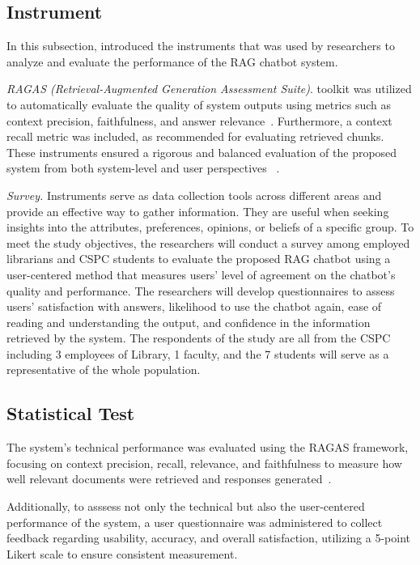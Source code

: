 \begin{refsection}
\subsection{Instrument}

In this subsection, introduced the instruments that was used by researchers to analyze and evaluate the performance of the RAG chatbot system.

\textit{RAGAS (Retrieval-Augmented Generation Assessment Suite)}. toolkit was utilized to automatically evaluate the quality of system outputs using metrics such as context precision, faithfulness, and answer relevance~\cite{shinn2023ragas}. Furthermore, a context recall metric was included, as recommended for evaluating retrieved chunks. These instruments ensured a rigorous and balanced evaluation of the proposed system from both system-level and user perspectives~ \cite{lin2021bert}.

\textit{Survey.} Instruments serve as data collection tools across different areas and provide an effective way to gather information. They are useful when seeking insights into the attributes, preferences, opinions, or beliefs of a specific group. To meet the study objectives, the researchers will conduct a survey among employed librarians and CSPC students to evaluate the proposed RAG chatbot using a user-centered method that measures users’ level of agreement on the chatbot’s quality and performance. The researchers will develop questionnaires to assess users’ satisfaction with answers, likelihood to use the chatbot again, ease of reading and understanding the output, and confidence in the information retrieved by the system. The respondents of the study are all from the CSPC including 3 employees of Library, 1 faculty, and the 7 students will serve as a representative of the whole population.


\subsection{Statistical Test}

The system’s technical performance was evaluated using the RAGAS framework, focusing on context precision, recall, relevance, and faithfulness to measure how well relevant documents were retrieved and responses generated~\cite{holmes2023chatbot, ameli2024ranking, lin2024satisfaction}.

Additionally, to asssess not only the technical but also the user-centered performance of the system, a user questionnaire was administered to collect feedback regarding usability, accuracy, and overall satisfaction, utilizing a 5-point Likert scale to ensure consistent measurement.


\end{refsection}
